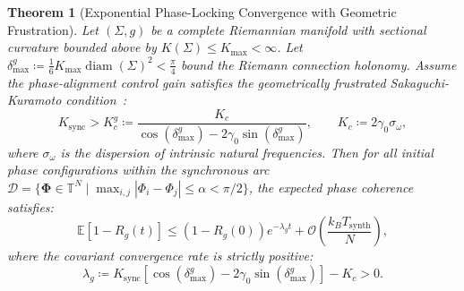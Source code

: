 \documentclass[11pt,a4paper,reqno]{article}
\theoremstyle{plain}
\newtheorem{theorem}{Theorem}[section]
\theoremstyle{definition}
\theoremstyle{remark}
\numberwithin{equation}{section}
\begin{document}
\begin{theorem}[Exponential Phase-Locking Convergence with Geometric Frustration]
\label{thm:curved_kuramoto}
Let $(\Sigma, g)$ be a complete Riemannian manifold with sectional curvature bounded above by $K(\Sigma) \le K_{\max} < \infty$. Let $\delta_{\max}^g \coloneqq \frac{1}{6} K_{\max} \operatorname{diam}(\Sigma)^2 < \frac{\pi}{4}$ bound the Riemann connection holonomy. Assume the phase-alignment control gain satisfies the geometrically frustrated Sakaguchi-Kuramoto condition~\cite{SakaguchiKuramoto1986}:
\begin{equation}
K_{\mathrm{sync}} > K_c^g \coloneqq \frac{K_c}{\cos(\delta_{\max}^g) - 2 \gamma_0 \sin(\delta_{\max}^g)}, \qquad K_c \coloneqq 2 \gamma_0 \sigma_\omega,
\end{equation}
where $\sigma_\omega$ is the dispersion of intrinsic natural frequencies. Then for all initial phase configurations within the synchronous arc $\mathcal{D} = \{ \bm{\Phi} \in \mathbb{T}^N \mid \max_{i, j} |\Phi_i - \Phi_j| \le \alpha < \pi/2 \}$, the expected phase coherence satisfies:
\begin{equation}
\mathbb{E}\left[ 1 - R_g(t) \right] \le \left(1 - R_g(0)\right) e^{-\lambda_g t} + \mathcal{O}\left( \frac{k_B T_{\mathrm{synth}}}{N} \right),
\label{eq:exp_decay_bound}
\end{equation}
where the covariant convergence rate is strictly positive:
\begin{equation}
\lambda_g \coloneqq K_{\mathrm{sync}} \left[ \cos(\delta_{\max}^g) - 2 \gamma_0 \sin(\delta_{\max}^g) \right] - K_c > 0.
\label{eq:true_lambda_g}
\end{equation}
\end{theorem}
\end{document}
